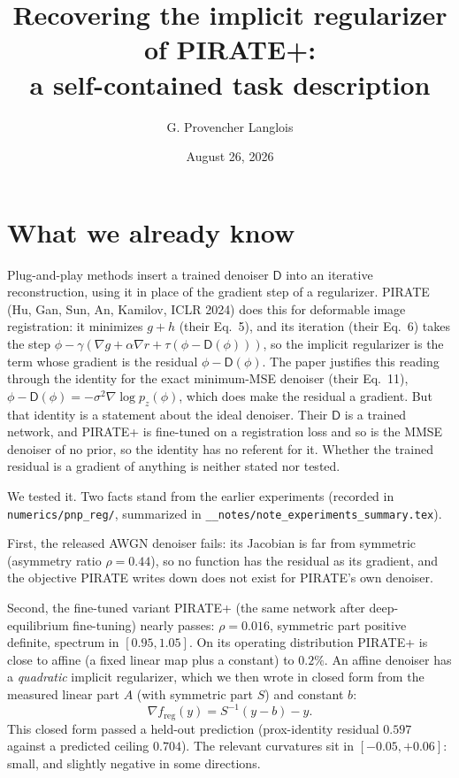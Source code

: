 \documentclass[11pt]{article}
\title{Recovering the implicit regularizer of PIRATE+:\\ a self-contained task description}
\author{G. Provencher Langlois}
\date{August 26, 2026}
\newcommand{\D}{\mathsf{D}}
\newcommand{\freg}{f_{\mathrm{reg}}}
\newcommand{\code}[1]{\texttt{#1}}
\begin{document}
\maketitle

\section{What we already know}

Plug-and-play methods insert a trained denoiser $\D$ into an iterative reconstruction, using it in place of the gradient step of a regularizer. PIRATE (Hu, Gan, Sun, An, Kamilov, ICLR 2024) does this for deformable image registration: it minimizes $g + h$ (their Eq.~5), and its iteration (their Eq.~6) takes the step $\phi - \gamma(\nabla g + \alpha\nabla r + \tau(\phi - \D(\phi)))$, so the implicit regularizer is the term whose gradient is the residual $\phi - \D(\phi)$. The paper justifies this reading through the identity for the exact minimum-MSE denoiser (their Eq.~11), $\phi - \D(\phi) = -\sigma^2\nabla\log p_z(\phi)$, which does make the residual a gradient. But that identity is a statement about the ideal denoiser. Their $\D$ is a trained network, and PIRATE+ is fine-tuned on a registration loss and so is the MMSE denoiser of no prior, so the identity has no referent for it. Whether the trained residual is a gradient of anything is neither stated nor tested.

We tested it. Two facts stand from the earlier experiments (recorded in \code{numerics/pnp\_reg/}, summarized in \code{\_\_notes/note\_experiments\_summary.tex}).

First, the released AWGN denoiser fails: its Jacobian is far from symmetric (asymmetry ratio $\rho = 0.44$), so no function has the residual as its gradient, and the objective PIRATE writes down does not exist for PIRATE's own denoiser.

Second, the fine-tuned variant PIRATE+ (the same network after deep-equilibrium fine-tuning) nearly passes: $\rho = 0.016$, symmetric part positive definite, spectrum in $[0.95, 1.05]$. On its operating distribution PIRATE+ is close to affine (a fixed linear map plus a constant) to $0.2\%$. An affine denoiser has a \emph{quadratic} implicit regularizer, which we then wrote in closed form from the measured linear part $A$ (with symmetric part $S$) and constant $b$:
\begin{equation}
\nabla\freg(y) = S^{-1}(y - b) - y .
\label{eq:quad}
\end{equation}
This closed form passed a held-out prediction (prox-identity residual $0.597$ against a predicted ceiling $0.704$). The relevant curvatures sit in $[-0.05, +0.06]$: small, and slightly negative in some directions.
\end{document}
